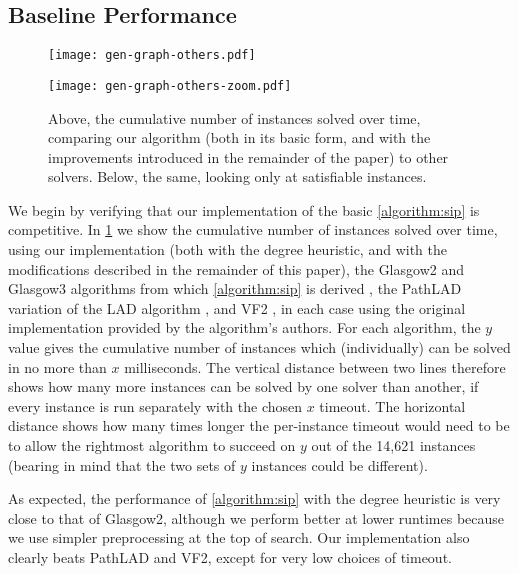 \documentclass[letterpaper]{article} %
\begin{document}
\subsection{Baseline Performance}

\begin{figure}[tb]
    \centering
    \texttt{[image: gen-graph-others.pdf]}

    \bigskip

    \centering
    \texttt{[image: gen-graph-others-zoom.pdf]}

    \caption{Above, the cumulative number of instances solved over time, comparing our algorithm
    (both in its basic form, and with the improvements introduced in the remainder of the paper) to
    other solvers. Below, the same, looking only at satisfiable instances.}
    \label{figure:others}
\end{figure}

We begin by verifying that our implementation of the basic \cref{algorithm:sip} is competitive. In
\cref{figure:others} we show the cumulative number of instances solved over time, using our
implementation (both with the degree heuristic, and with the modifications described in the
remainder of this paper), the Glasgow2 and Glasgow3 algorithms from which \cref{algorithm:sip} is derived
\cite{DBLP:conf/cp/McCreeshP15,DBLP:conf/lion/KotthoffMS16}, the PathLAD variation of the LAD
algorithm \cite{DBLP:journals/ai/Solnon10,DBLP:conf/lion/KotthoffMS16}, and VF2
\cite{DBLP:journals/pami/CordellaFSV04}, in each case using the original implementation provided
by the algorithm's authors. For each algorithm, the $y$ value
gives the cumulative number of instances which (individually) can be solved in no more than $x$
milliseconds.  The vertical distance between two lines therefore shows how many more instances can
be solved by one solver than another, if every instance is run separately with the chosen $x$
timeout. The horizontal distance shows how many times longer the per-instance timeout would need to
be to allow the rightmost algorithm to succeed on $y$ out of the 14,621 instances (bearing in mind
that the two sets of $y$ instances could be different).

As expected, the performance of \cref{algorithm:sip} with the degree heuristic is very close to that
of Glasgow2, although we perform better at lower runtimes because we use simpler preprocessing at
the top of search. Our implementation also clearly beats PathLAD and VF2, except for very low
choices of timeout.
\end{document}
